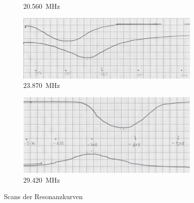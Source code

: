 \begin{figure}
\begin{subfigure}{0.5\textwidth}
		\caption{\SI{20.560}{\mega\hertz}}
		\label{fig:Scan20} 
	\end{subfigure}
	\begin{subfigure}{0.5\textwidth}
		\includegraphics[width=1\linewidth]{Scan25.pdf}
		\caption{\SI{23.870}{\mega\hertz}}
		\label{fig:Scan25}
	\end{subfigure}
	\begin{subfigure}{0.5\textwidth}
		\includegraphics[width=1\linewidth]{Scan30.pdf}
		\caption{\SI{29.420}{\mega\hertz}}
		\label{fig:Scan30}
	\end{subfigure}
	\caption{Scans der Resonanzkurven}
\end{figure}
